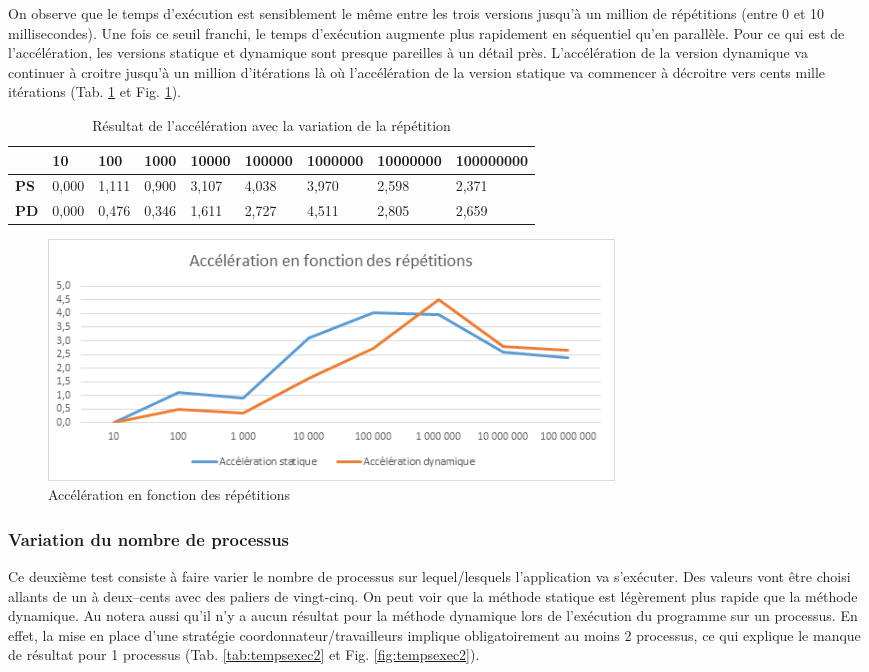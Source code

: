 \documentclass[a4paper,12pt]{article}
\begin{document}
On observe que le temps d'exécution est sensiblement le même entre les trois versions jusqu'à un million de répétitions (entre 0 et 10 millisecondes). Une fois ce seuil franchi, le temps d'exécution augmente plus rapidement en séquentiel qu'en parallèle. Pour ce qui est de l'accélération, les versions statique et dynamique sont presque pareilles à un détail près. L'accélération de la version dynamique va continuer à croitre jusqu'à un million d'itérations là où l'accélération de la version statique va commencer à décroitre vers cents mille itérations (Tab. \ref{tab:acc1} et Fig. \ref{fig:acc1}).

\begin{table}[H]
\caption{Résultat de l'accélération avec la variation de la répétition}
\label{tab:acc1}
\begin{tabular}{|l|l|l|l|l|l|l|l|l|}
\hline
            & \textbf{10} & \textbf{100} & \textbf{1000} & \textbf{10000} & \textbf{100000} & \textbf{1000000} & \textbf{10000000} & \textbf{100000000} \\ \hline
\textbf{PS} & 0,000       & 1,111        & 0,900         & 3,107          & 4,038           & 3,970            & 2,598             & 2,371              \\ \hline
\textbf{PD} & 0,000       & 0,476        & 0,346         & 1,611          & 2,727           & 4,511            & 2,805             & 2,659              \\ \hline
\end{tabular}
\end{table}

\begin{figure}[H]
\center \includegraphics[width=15cm]{acc1} %
\caption{Accélération en fonction des répétitions}
\label{fig:acc1}
\end{figure}

\subsubsection{Variation du nombre de processus}
Ce deuxième test consiste à faire varier le nombre de processus sur lequel/lesquels l'application va s'exécuter. Des valeurs vont être choisi allants de un à deux–cents avec des paliers de vingt-cinq. On peut voir que la méthode statique est légèrement plus rapide que la méthode dynamique. Au notera aussi qu'il n'y a aucun résultat pour la méthode dynamique lors de l'exécution du programme sur un processus. En effet, la mise en place d'une stratégie coordonnateur/travailleurs implique obligatoirement au moins 2 processus, ce qui explique le manque de résultat pour 1 processus (Tab. \ref{tab:tempsexec2} et Fig. \ref{fig:tempsexec2}).
\end{document}
